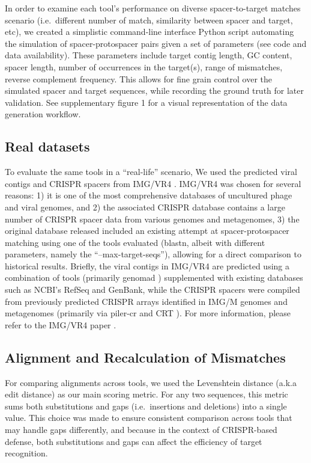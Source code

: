 \documentclass[
]{article}
\begin{document}
In order to examine each tool's performance on diverse spacer-to-target
matches scenario (i.e.~different number of match, similarity between
spacer and target, etc), we created a simplistic command-line interface
Python script automating the simulation of spacer-protospacer pairs
given a set of parameters (see code and data availability). These
parameters include target contig length, GC content, spacer length,
number of occurrences in the target(s), range of mismatches, reverse
complement frequency. This allows for fine grain control over the
simulated spacer and target sequences, while recording the ground truth
for later validation. See supplementary figure 1 for a visual
representation of the data generation workflow.

\subsection{Real datasets}\label{real-datasets}

To evaluate the same tools in a ``real-life'' scenario, We used the
predicted viral contigs and CRISPR spacers from IMG/VR4
\autocite{camargo_img_vr4_2023}. IMG/VR4 was chosen for several reasons:
1) it is one of the most comprehensive databases of uncultured phage and
viral genomes, and 2) the associated CRISPR database contains a large
number of CRISPR spacer data from various genomes and metagenomes, 3)
the original database released included an existing attempt at
spacer-protospacer matching using one of the tools evaluated (blastn,
albeit with different parameters, namely the ``--max-target-seqs''),
allowing for a direct comparison to historical results. Briefly, the
viral contigs in IMG/VR4 are predicted using a combination of tools
(primarily genomad \autocite{camargo_genomad_2024}) supplemented with
existing databases such as NCBI's RefSeq and GenBank, while the CRISPR
spacers were compiled from previously predicted CRISPR arrays identified
in IMG/M genomes and metagenomes (primarily via piler-cr
\autocite{edgar_piler_cr_2007} and CRT \autocite{bland_crt_2007}). For
more information, please refer to the IMG/VR4 paper
\autocite{camargo_img_vr4_2023}.

\subsection{Alignment and Recalculation of
Mismatches}\label{sec-alignment-recalc}

For comparing alignments across tools, we used the Levenshtein distance
\autocite{levenshtein1966} (a.k.a edit distance) as our main scoring
metric. For any two sequences, this metric sums both substitutions and
gaps (i.e.~insertions and deletions) into a single value. This choice
was made to ensure consistent comparison across tools that may handle
gaps differently, and because in the context of CRISPR-based defense,
both substitutions and gaps can affect the efficiency of target
recognition.
\end{document}
